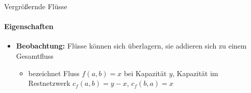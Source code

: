 \documentclass{vorlesung}
\newcommand{\mrk}[1]{\textcolor{ubrot}{\bfseries #1}}
\begin{document}
\begin{frame}{Vergrößernde Flüsse}
\framesubtitle{Eigenschaften}
\begin{itemize}
	\item \mrk{Beobachtung:} Flüsse können sich überlagern, sie addieren sich zu einem Gesamtfluss
	\begin{itemize}
		\item {} bezeichnet Fluss $f(a,b)=x$ bei Kapazität $y$, Kapazität im Restnetzwerk $c_f(a,b) = y-x$, $c_f(b,a)=x$
	\end{itemize}
\end{itemize}


\end{frame}
\end{document}
